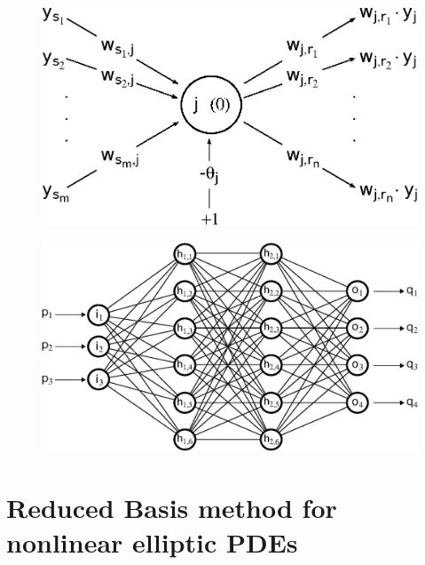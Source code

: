 \documentclass[11pt, a4paper]{report}
\numberwithin{equation}{chapter}
\theoremstyle{theorem}
\theoremstyle{definition}
\numberwithin{figure}{section}
\begin{document}
		\begin{figure}[H]
			\center
			\includegraphics[scale = 0.7]{neural_model_bias.eps}
			
			\caption{}
			\label{fig:neural-model-bias}
		\end{figure}
		
		\begin{figure}[H]
			\center
			\includegraphics[scale = 0.6]{neural_network_bis.eps}
			
			\caption{}
			\label{fig:neural-network}
		\end{figure}
		
	 
		 
		 
		 

	\chapter{Reduced Basis method for nonlinear elliptic PDEs}
	\label{chapter:Reduced Basis method for nonlinear elliptic PDEs}
	
\end{document}
